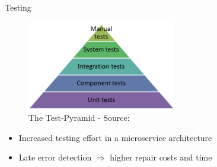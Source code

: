 \documentclass{beamer}
\begin{document}
\begin{frame}{}
  \begin{center}

    
  \end{center}
\end{frame}






\begin{frame}{}
  \vspace{-0.5cm}
  \begin{center}
    \Large Testing
  \end{center}

  \vspace{-0.5cm}
  \begin{figure}
    \includegraphics[width=0.58\textwidth]{img/tests-pyramid.png}
    \caption{\footnotesize The Test-Pyramid - \textcolor{uos-grey-full}{Source: {\cite{microtest}}}}
  \end{figure}
  \vspace{-0.2cm}

  \begin{block}{}
    \begin{itemize}
      \small
      \setlength\itemsep{0em}
      \item Increased testing effort in a microservice architecture
      \item Late error detection \(\Rightarrow \) higher repair costs and time
    \end{itemize}
  \end{block}
\end{frame}
\end{document}
